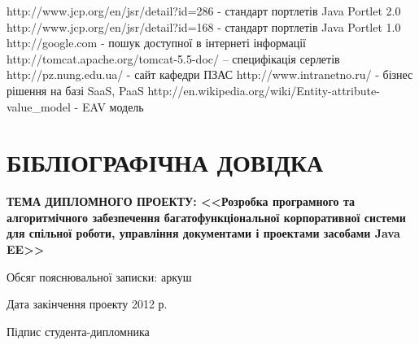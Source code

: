\renewcommand{\refname}{СПИСОК ПОСИЛАНЬ НА ДЖЕРЕЛА}
\begin{thebibliography}{99}
 http://www.jcp.org/en/jsr/detail?id=286 - стандарт портлетів Java Portlet 2.0
 http://www.jcp.org/en/jsr/detail?id=168 - стандарт портлетів Java Portlet 1.0
 http://google.com - пошук доступної в інтернеті інформації
 http://tomcat.apache.org/tomcat-5.5-doc/ -- специфікація серлетів
 http://pz.nung.edu.ua/ - сайт кафедри ПЗАС
 http://www.intranetno.ru/ - бізнес рішення на базі SaaS, PaaS
 http://en.wikipedia.org/wiki/Entity-attribute-value\_model - EAV модель
\end{thebibliography}

\newpage
{} %

\section*{БІБЛІОГРАФІЧНА ДОВІДКА}
{\bf ТЕМА ДИПЛОМНОГО ПРОЕКТУ: <<Розробка програмного та алгоритмічного забезпечення багатофункціональної корпоративної системи для спільної роботи, управління документами і проектами засобами Java EE>>}
\vspace{30 mm}
\par Обсяг пояснювальної записки:\noindent\underline{} аркуш

\vspace{60 mm}

\par Дата закінчення проекту   \noindent\underline{} 2012 р.
\vspace{10 mm}
\par Підпис студента-дипломника \noindent\underline{\makebox[1.0in][c]{}}



